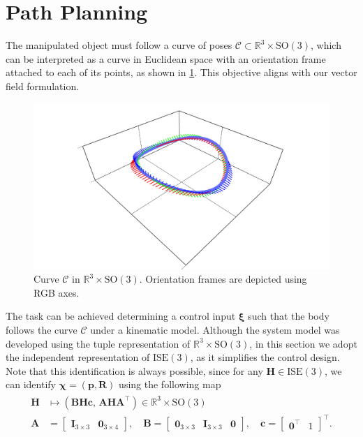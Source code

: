 \section{Path Planning}\label{sec:collaborative-path-planning}
The manipulated object must follow a curve of poses $\mathcal{C}\subset \mathbb{R}^3\times\text{SO}(3)$, which can be interpreted as a curve in Euclidean space with an orientation frame attached to each of its points, as shown in \cref{fig:curvewithframes}. This objective aligns with our vector field formulation.
\begin{figure}[ht]
    \centering
    \includegraphics[width=.8\linewidth]{figures/curve_with_frames.pdf}
    \caption{Curve $\mathcal{C}$ in $\mathbb{R}^3\times\text{SO}(3)$. Orientation frames are depicted using RGB axes.}
    \label{fig:curvewithframes}
\end{figure}

The task can be achieved determining a control input $\boldsymbol{\xi}$ such that the body follows the curve $\mathcal{C}$ under a kinematic model. Although the system model was developed using the tuple representation of $\mathbb{R}^3\times\text{SO}(3)$, in this section we adopt the independent representation of $\text{ISE}(3)$, as it simplifies the control design. Note that this identification is always possible, since for any $\mathbf{H}\in\text{ISE}(3)$, we can identify $\boldsymbol{\chi}=(\mathbf{p}, \mathbf{R})$ using the following map
\begin{align}
    \begin{split}
        \mathbf{H} &\mapsto (\mathbf{B}\mathbf{H}\mathbf{c},\, \mathbf{A}\mathbf{H}\mathbf{A}^\top) \in \mathbb{R}^3\times\text{SO}(3)\\
        \mathbf{A} &= \begin{bmatrix}
            \mathbf{I}_{3\times 3} & \mathbf{0}_{3\times 4}
        \end{bmatrix}, \quad
        \mathbf{B} = \begin{bmatrix}
            \mathbf{0}_{3\times 3} & \mathbf{I}_{3\times 3} & \mathbf{0}
        \end{bmatrix}, \quad
        \mathbf{c} = \begin{bmatrix}
            \mathbf{0}^\top & 1
        \end{bmatrix}^\top.
    \end{split}
\end{align}

